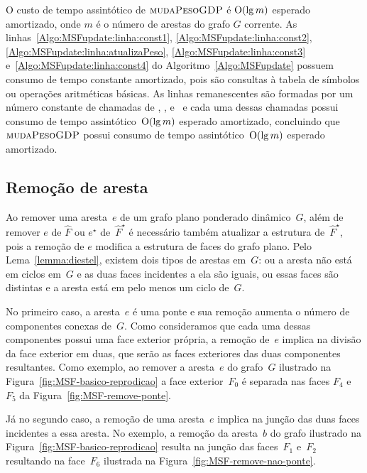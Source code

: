 O custo de tempo assintótico de $\text{\scshape mudaPesoGDP}$ é $\mathrm{O}(\lg m)$ esperado amortizado, onde $m$ é o número de arestas do grafo $G$ corrente.
As linhas~\ref{Algo:MSFupdate:linha:const1}, \ref{Algo:MSFupdate:linha:const2}, \ref{Algo:MSFupdate:linha:atualizaPeso}, \ref{Algo:MSFupdate:linha:const3} e~\ref{Algo:MSFupdate:linha:const4} do Algoritmo~\ref{Algo:MSFupdate} possuem consumo de tempo constante amortizado, pois são consultas à tabela de símbolos ou operações aritméticas básicas.
As linhas remanescentes são formadas por um número constante de chamadas de \LCOAddCost, \LCOFindNode, \LCOMerge{} e~\LCOSplit{} e cada uma dessas chamadas possui consumo de tempo assintótico~$\mathrm{O}(\lg m)$ esperado amortizado, concluindo que $\text{\scshape mudaPesoGDP}$ possui consumo de tempo assintótico~$\mathrm{O}(\lg m)$ esperado amortizado.

\subsection{Remoção de aresta}

Ao remover uma aresta~$e$ de um grafo plano ponderado dinâmico~$G$, além de remover $e$ de $\hat F$ ou $e^\star$ de~$\hat F^\star$ é necessário também atualizar a estrutura de~$\hat F^\star$, pois a remoção de $e$ modifica a estrutura de faces do grafo plano.
Pelo Lema~\ref{lemma:diestel}, existem dois tipos de arestas em~$G$: ou a aresta não está em ciclos em~$G$ e as duas faces incidentes a ela são iguais, ou essas faces são distintas e a aresta está em pelo menos um ciclo de~$G$.

No primeiro caso, a aresta~$e$ é uma ponte e sua remoção aumenta o número de componentes conexas de~$G$.
Como consideramos que cada uma dessas componentes possui uma face exterior própria, a remoção de~$e$ implica na divisão da face exterior em duas, que serão as faces exteriores das duas componentes resultantes.
Como exemplo, ao remover a aresta~$e$ do grafo~$G$ ilustrado na Figura~\ref{fig:MSF-basico-reprodicao} a face exterior~$F_0$ é separada nas faces $F_4$ e~$F_5$ da Figura~\ref{fig:MSF-remove-ponte}.


Já no segundo caso, a remoção de uma aresta~$e$ implica na junção das duas faces incidentes a essa aresta.
No exemplo, a remoção da aresta~$b$ do grafo ilustrado na Figura~\ref{fig:MSF-basico-reprodicao} resulta na junção das faces~$F_1$ e~$F_2$ resultando na face~$F_6$ ilustrada na Figura~\ref{fig:MSF-remove-nao-ponte}.

